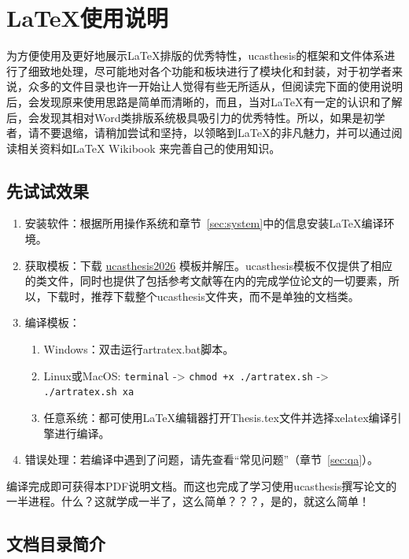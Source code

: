 \chapter{\LaTeX{}使用说明}\label{chap:guide}

为方便使用及更好地展示\LaTeX{}排版的优秀特性，ucasthesis的框架和文件体系进行了细致地处理，尽可能地对各个功能和板块进行了模块化和封装，对于初学者来说，众多的文件目录也许一开始让人觉得有些无所适从，但阅读完下面的使用说明后，会发现原来使用思路是简单而清晰的，而且，当对\LaTeX{}有一定的认识和了解后，会发现其相对Word类排版系统极具吸引力的优秀特性。所以，如果是初学者，请不要退缩，请稍加尝试和坚持，以领略到\LaTeX{}的非凡魅力，并可以通过阅读相关资料如\LaTeX{} Wikibook \citep{wikibook2014latex} 来完善自己的使用知识。

\section{先试试效果}

\begin{enumerate}
    \item 安装软件：根据所用操作系统和章节~\ref{sec:system}中的信息安装\LaTeX{}编译环境。
    \item 获取模板：下载 \href{https://github.com/wang2000star/ucasthesis2026}{ucasthesis2026} 模板并解压。ucasthesis模板不仅提供了相应的类文件，同时也提供了包括参考文献等在内的完成学位论文的一切要素，所以，下载时，推荐下载整个ucasthesis文件夹，而不是单独的文档类。
    \item 编译模板：
        \begin{enumerate}
            \item Windows：双击运行artratex.bat脚本。
            \item Linux或MacOS: {\scriptsize \verb|terminal| -> \verb|chmod +x ./artratex.sh| -> \verb|./artratex.sh xa|}
            \item 任意系统：都可使用\LaTeX{}编辑器打开Thesis.tex文件并选择xelatex编译引擎进行编译。
        \end{enumerate}
    \item 错误处理：若编译中遇到了问题，请先查看“常见问题”（章节~\ref{sec:qa}）。
\end{enumerate}

编译完成即可获得本PDF说明文档。而这也完成了学习使用ucasthesis撰写论文的一半进程。什么？这就学成一半了，这么简单？？？，是的，就这么简单！

\section{文档目录简介}

